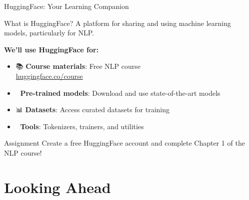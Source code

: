 \documentclass[aspectratio=169]{beamer}
\begin{document}
\begin{frame}[shrink=10]{HuggingFace: Your Learning Companion 🤗}
\small
\begin{block}{What is HuggingFace?}
A platform for sharing and using machine learning models, particularly for NLP.
\end{block}

\vspace{0.2cm}

\textbf{We'll use HuggingFace for:}
\begin{itemize}\setlength{\itemsep}{0pt}\setlength{\itemsep}{0pt}
    \item 📚 \textbf{Course materials}: Free NLP course\\
    \href{https://huggingface.co/course}{huggingface.co/course}
    \item 🤖 \textbf{Pre-trained models}: Download and use state-of-the-art models
    \item 📊 \textbf{Datasets}: Access curated datasets for training
    \item 🔧 \textbf{Tools}: Tokenizers, trainers, and utilities
\end{itemize}

\vspace{0.2cm}

\begin{alertblock}{Assignment}
Create a free HuggingFace account and complete Chapter 1 of the NLP course!
\end{alertblock}
\end{frame}

\section{Looking Ahead}
\end{document}

